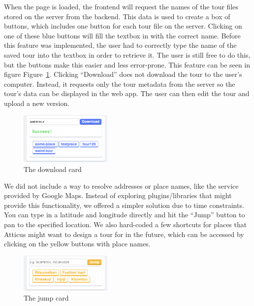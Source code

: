 \documentclass[a4paper, 10pt, american, titlepage]{article}
\begin{document}
When the page is loaded, the frontend will request the names of the tour files
stored on the server from the backend. This data is used to create a box of
buttons, which includes one button for each tour file on the server. Clicking
on one of these blue buttons will fill the textbox in with the correct name.
Before this feature was implemented, the user had to correctly type the name of
the saved tour into the textbox in order to retrieve it. The user is still free
to do this, but the buttons make this easier and less error-prone. This feature
can be seen in figure Figure~\ref{fig:downloadCard}. Clicking ``Download'' does
not download the tour to the user's computer. Instead, it requests only the
tour metadata from the server so the tour's data can be displayed in the web
app. The user can then edit the tour and upload a new version.

\begin{figure}[h]
	\centering
    \includegraphics[width=0.4\textwidth]{download-card-editour.png}
    \caption{The download card}
	\label{fig:downloadCard}
\end{figure}

We did not include a way to resolve addresses or place names, like the service
provided by Google Maps. Instead of exploring plugins/libraries that might
provide this functionality, we offered a simpler solution due to time
constraints.  You can type in a latitude and longitude directly and hit the
``Jump'' button to pan to the specified location. We also hard-coded a few
shortcuts for places that Atticus might want to design a tour for in the future,
which can be accessed by clicking on the yellow buttons with place names.

\begin{figure}[h]
	\centering
    \includegraphics[width=0.4\textwidth]{jump-card-editour.png}
    \caption{The jump card}
	\label{fig:jumpCard}
\end{figure}
\end{document}
